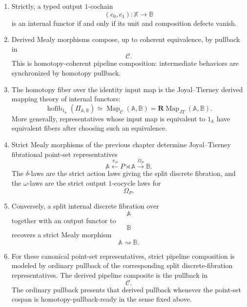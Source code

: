 \begin{theorem}
\begin{enumerate}
\item Strictly, a typed output \(1\)-cochain
\[
(c_0,c_1):\mathbb X\to\mathbb B
\]
is an internal functor if and only if its unit and composition defects
vanish.

\item Derived Mealy morphisms compose, up to coherent equivalence, by
pullback in
\[
\mathcal C.
\]
This is homotopy-coherent pipeline composition: intermediate behaviors
are synchronized by homotopy pullback.

\item The homotopy fiber over the identity input map is the
Joyal--Tierney derived mapping theory of internal functors:
\[
\operatorname{hofib}_{1_{\mathbb A}}
\left(
\Pi_{\mathbb A,\mathbb B}
\right)
\simeq
\operatorname{Map}_{\mathcal C}(\mathbb A,\mathbb B)
=
\mathbf R\!\operatorname{Map}_{JT}(\mathbb A,\mathbb B).
\]
More generally, representatives whose input map is equivalent to
\(1_{\mathbb A}\) have equivalent fibers after choosing such an
equivalence.

\item Strict Mealy morphisms of the previous chapter determine
Joyal--Tierney fibrational point-set representatives
\[
\mathbb A
\xleftarrow{\pi_P}
P\rtimes\mathbb A
\xrightarrow{\Omega_P}
\mathbb B.
\]
The \(\delta\)-laws are the strict action laws giving the split discrete
fibration, and the \(\omega\)-laws are the strict output \(1\)-cocycle
laws for
\[
\Omega_P.
\]

\item Conversely, a split internal discrete fibration over
\[
\mathbb A
\]
together with an output functor to
\[
\mathbb B
\]
recovers a strict Mealy morphism
\[
\mathbb A\rightsquigarrow\mathbb B.
\]

\item For these canonical point-set representatives, strict pipeline
composition is modeled by ordinary pullback of the corresponding split
discrete-fibration representatives. The derived pipeline composite is
the pullback in
\[
\mathcal C.
\]
The ordinary pullback presents that derived pullback whenever the
point-set cospan is homotopy-pullback-ready in the sense fixed above.
\end{enumerate}
\end{theorem}

